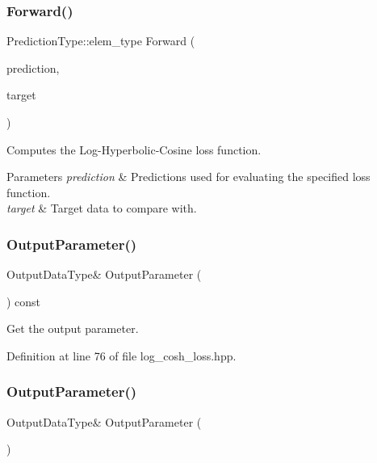 \subsubsection{Forward()}
{\footnotesize\ttfamily Prediction\+Type\+::elem\+\_\+type Forward (\begin{DoxyParamCaption}\item[{const Prediction\+Type \&}]{prediction,  }\item[{const Target\+Type \&}]{target }\end{DoxyParamCaption})}



Computes the Log-\/\+Hyperbolic-\/\+Cosine loss function. 


\begin{DoxyParams}{Parameters}
{\em prediction} & Predictions used for evaluating the specified loss function. \\
\hline
{\em target} & Target data to compare with. \\
\hline
\end{DoxyParams}
\mbox{\label{classmlpack_1_1ann_1_1LogCoshLoss_a8bae962cc603d1cab8d80ec78f8d505d}} 
\subsubsection{Output\+Parameter()\hspace{0.1cm}{\footnotesize\ttfamily [1/2]}}
{\footnotesize\ttfamily Output\+Data\+Type\& Output\+Parameter (\begin{DoxyParamCaption}{ }\end{DoxyParamCaption}) const\hspace{0.3cm}{\ttfamily [inline]}}



Get the output parameter. 



Definition at line 76 of file log\+\_\+cosh\+\_\+loss.\+hpp.

\mbox{\label{classmlpack_1_1ann_1_1LogCoshLoss_a21d5f745f02c709625a4ee0907f004a5}} 
\subsubsection{Output\+Parameter()\hspace{0.1cm}{\footnotesize\ttfamily [2/2]}}
{\footnotesize\ttfamily Output\+Data\+Type\& Output\+Parameter (\begin{DoxyParamCaption}{ }\end{DoxyParamCaption})\hspace{0.3cm}{\ttfamily [inline]}}




